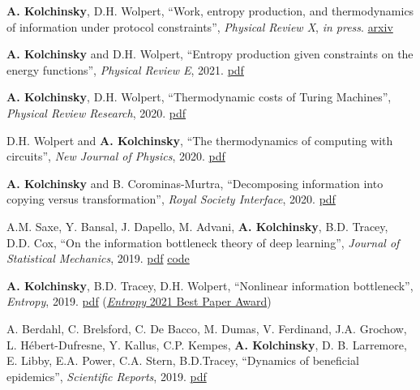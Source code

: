 
\newcommand{\pdflink}[1]{\href{https://artemyk.github.io/assets/pdf/papers/#1.pdf}{pdf}}

\textbf{A. Kolchinsky}, D.H. Wolpert, ``Work, entropy production, and thermodynamics of information under protocol constraints'', \emph{Physical Review X}, \emph{in press}. \href{http://arxiv.org/abs/2008.10764}{arxiv}

\textbf{A. Kolchinsky} and D.H. Wolpert, ``Entropy production given constraints on the energy functions'', \emph{Physical Review E}, 2021. \pdflink{Kolchinsky and Wolpert - 2021 - Entropy production given constraints on the energy functions}

\textbf{A. Kolchinsky}, D.H. Wolpert, ``Thermodynamic costs of Turing Machines'', \emph{Physical Review Research}, 2020. %
\pdflink{Kolchinsky_Wolpert_2020_Thermodynamic costs of Turing machines}

D.H. Wolpert and \textbf{A. Kolchinsky}, ``The thermodynamics of computing with circuits'', \emph{New Journal of Physics}, 2020.  %
\pdflink{Wolpert and Kolchinsky - 2020 - Thermodynamics of computing with circuits}

\textbf{A. Kolchinsky} and B. Corominas-Murtra, ``Decomposing information into copying versus transformation'', 
\emph{Royal Society Interface}, 2020. %
\pdflink{Kolchinsky_Corominas-Murtra_2020_Decomposing information into copying versus transformation}

A.M. Saxe, Y. Bansal, J. Dapello, M. Advani, \textbf{A. Kolchinsky}, B.D. Tracey, D.D. Cox, 
``On the information bottleneck theory of deep learning'',  \emph{Journal of Statistical Mechanics}, 2019. 
\pdflink{Saxe et al_2019_On the information bottleneck theory of deep learning} 
\href{https://github.com/artemyk/ibsgd/tree/iclr2018}{code} %

\textbf{A. Kolchinsky}, B.D. Tracey, D.H. Wolpert, ``Nonlinear information bottleneck'', \emph{Entropy}, 2019.
\pdflink{Kolchinsky et al_2019_Nonlinear information bottleneck} (\href{https://www.mdpi.com/journal/entropy/awards/1209}{{\emph{Entropy} 2021 Best Paper Award}})

A. Berdahl, C. Brelsford, C. De Bacco, M. Dumas, V. Ferdinand, J.A. Grochow, L. Hébert-Dufresne,
Y. Kallus, C.P. Kempes, \textbf{A. Kolchinsky}, D. B. Larremore,
E. Libby, E.A. Power, C.A. Stern, B.D.Tracey, ``Dynamics of beneficial epidemics'', \emph{Scientific Reports}, 2019. 
\pdflink{Berdahl et al_2019_Dynamics of beneficial epidemics}

